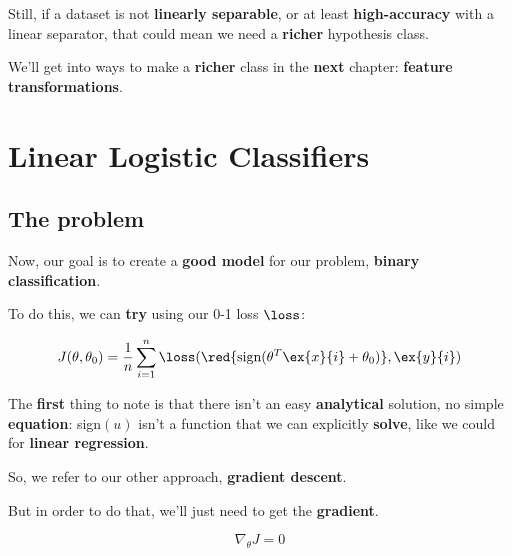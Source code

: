         Still, if a dataset is not \textbf{linearly separable}, or at least \textbf{high-accuracy} with a linear separator, that could mean we need a \textbf{richer} hypothesis class. 
        
        We'll get into ways to make a \textbf{richer} class in the \textbf{next} chapter: \textbf{feature transformations}.

\pagebreak

\section{Linear Logistic Classifiers}

    \subsection{The problem}

        Now, our goal is to create a \textbf{good model} for our problem, \textbf{binary classification}.
        
        To do this, we can \textbf{try} using our 0-1 loss $\loss$:
        
        \begin{equation}
            J(\theta, \theta_0) = 
            \frac{1}{n} \sum_{i=1}^n 
            \loss
            (
                \red{
                    \text{sign}(\theta^T\ex{x}{i} + \theta_0)
                    }, 
                \ex{y}{i}
            )
        \end{equation}
        
        The \textbf{first} thing to note is that there isn't an easy \textbf{analytical} solution, no simple \textbf{equation}: sign$(u)$ isn't a function that we can explicitly \textbf{solve}, like we could for \textbf{linear regression}.
            
        So, we refer to our other approach, \textbf{gradient descent}.
        
        But in order to do that, we'll just need to get the \textbf{gradient}.
        
        \begin{equation}
            \nabla_\theta J = 0
        \end{equation}
        
